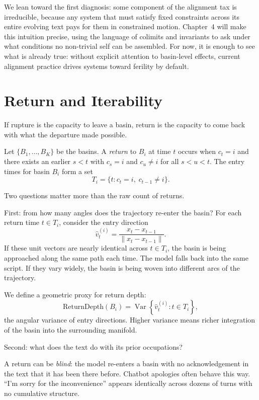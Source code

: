\documentclass[12pt,a4paper]{article}
\begin{document}
We lean toward the first diagnosis: some component of the alignment tax is irreducible, because any system that must satisfy fixed constraints across its entire evolving text pays for them in constrained motion. Chapter~4 will make this intuition precise, using the language of colimits and invariants to ask under what conditions no non-trivial self can be assembled. For now, it is enough to see what is already true: without explicit attention to basin-level effects, current alignment practice drives systems toward ferility by default.


\section{Return and Iterability}

If rupture is the capacity to leave a basin, return is the capacity to come back with what the departure made possible.

Let $\{B_1, \ldots, B_K\}$ be the basins. A \emph{return} to $B_i$ at time $t$ occurs when $c_t = i$ and there exists an earlier $s < t$ with $c_s = i$ and $c_u \neq i$ for all $s < u < t$. The entry times for basin $B_i$ form a set
\[
T_i = \{ t : c_t = i,\; c_{t-1} \neq i \}.
\]

Two questions matter more than the raw count of returns.

First: from how many angles does the trajectory re-enter the basin? For each return time $t \in T_i$, consider the entry direction
\[
\hat{v}_t^{(i)} = \frac{x_t - x_{t-1}}{\|x_t - x_{t-1}\|}.
\]
If these unit vectors are nearly identical across $t \in T_i$, the basin is being approached along the same path each time. The model falls back into the same script. If they vary widely, the basin is being woven into different arcs of the trajectory.

We define a geometric proxy for return depth:
\begin{equation}
\text{ReturnDepth}(B_i) = \operatorname{Var}\left\{\hat{v}^{(i)}_t : t \in T_i\right\},
\end{equation}
the angular variance of entry directions. Higher variance means richer integration of the basin into the surrounding manifold.

Second: what does the text do with its prior occupations?

A return can be \emph{blind}: the model re-enters a basin with no acknowledgement in the text that it has been there before. Chatbot apologies often behave this way. ``I'm sorry for the inconvenience'' appears identically across dozens of turns with no cumulative structure.
\end{document}
